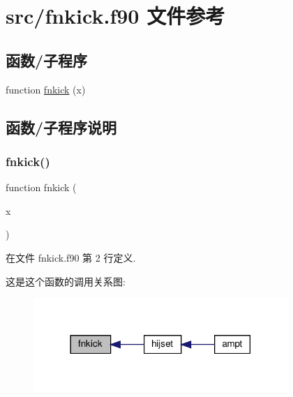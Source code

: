 \hypertarget{fnkick_8f90}{}\section{src/fnkick.f90 文件参考}
\label{fnkick_8f90}
\subsection*{函数/子程序}
\begin{DoxyCompactItemize}
\item 
function \mbox{\hyperlink{fnkick_8f90_a1335d12385980dc50fc88d75023fc54b}{fnkick}} (x)
\end{DoxyCompactItemize}


\subsection{函数/子程序说明}
\mbox{\label{fnkick_8f90_a1335d12385980dc50fc88d75023fc54b}} 
\subsubsection{\texorpdfstring{fnkick()}{fnkick()}}
{\footnotesize\ttfamily function fnkick (\begin{DoxyParamCaption}\item[{}]{x }\end{DoxyParamCaption})}



在文件 fnkick.\+f90 第 2 行定义.

这是这个函数的调用关系图\+:
\nopagebreak
\begin{figure}[H]
\begin{center}
\leavevmode
\includegraphics[width=273pt]{fnkick_8f90_a1335d12385980dc50fc88d75023fc54b_icgraph}
\end{center}
\end{figure}
